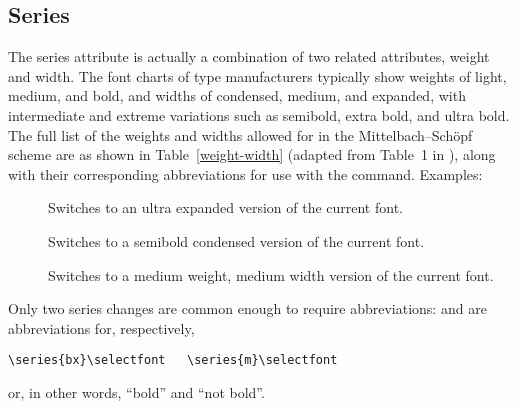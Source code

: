 \subsection{Series}

The series attribute is actually a combination of two related
attributes, weight and width.  The font charts
of type manufacturers typically show weights of light,
medium, and bold, and widths of condensed, medium, and expanded,
with intermediate and extreme variations such as semibold,
extra bold, and ultra bold.  The full list of the weights and
widths allowed for in the Mittelbach--Sch\"opf scheme are as shown
in Table~\ref{weight-width} (adapted from
Table~1 in \cite{msf}), along with their corresponding
 abbreviations for use with the  command.
Examples:
\begin{description}
\item[]
Switches to an ultra expanded version of the current font.

\item[]
Switches to a semibold condensed version of the current font.

\item[]
Switches to a medium weight, medium width version of the current font.
\end{description}
Only two series changes are common enough to require abbreviations:
 and  are abbreviations for,
respectively,
\begin{verbatim}
\series{bx}\selectfont   \series{m}\selectfont
\end{verbatim}
or, in other words, ``bold'' and ``not bold''.

